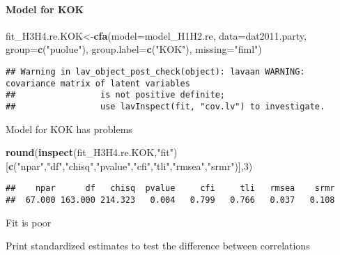 \documentclass[
]{article}
\newenvironment{Shaded}{\begin{snugshade}}{\end{snugshade}}
\newcommand{\DataTypeTok}[1]{\textcolor[rgb]{0.13,0.29,0.53}{#1}}
\newcommand{\DecValTok}[1]{\textcolor[rgb]{0.00,0.00,0.81}{#1}}
\newcommand{\KeywordTok}[1]{\textcolor[rgb]{0.13,0.29,0.53}{\textbf{#1}}}
\newcommand{\NormalTok}[1]{#1}
\newcommand{\StringTok}[1]{\textcolor[rgb]{0.31,0.60,0.02}{#1}}
\begin{document}
\newpage

\hypertarget{model-for-kok}{%
\paragraph{Model for KOK}\label{model-for-kok}}

\begin{Shaded}
\begin{Highlighting}[]
\NormalTok{fit_H3H4.re.KOK<-}\KeywordTok{cfa}\NormalTok{(}\DataTypeTok{model=}\NormalTok{model_H1H2.re,}
                    \DataTypeTok{data=}\NormalTok{dat2011.party,}
                    \DataTypeTok{group=}\KeywordTok{c}\NormalTok{(}\StringTok{"puolue"}\NormalTok{),}
                    \DataTypeTok{group.label=}\KeywordTok{c}\NormalTok{(}\StringTok{"KOK"}\NormalTok{),}
                    \DataTypeTok{missing=}\StringTok{"fiml"}\NormalTok{)}
\end{Highlighting}
\end{Shaded}

\begin{verbatim}
## Warning in lav_object_post_check(object): lavaan WARNING: covariance matrix of latent variables
##                 is not positive definite;
##                 use lavInspect(fit, "cov.lv") to investigate.
\end{verbatim}

Model for KOK has problems

\begin{Shaded}
\begin{Highlighting}[]
\KeywordTok{round}\NormalTok{(}\KeywordTok{inspect}\NormalTok{(fit_H3H4.re.KOK,}\StringTok{"fit"}\NormalTok{)}
\NormalTok{      [}\KeywordTok{c}\NormalTok{(}\StringTok{"npar"}\NormalTok{,}\StringTok{"df"}\NormalTok{,}\StringTok{"chisq"}\NormalTok{,}\StringTok{"pvalue"}\NormalTok{,}\StringTok{"cfi"}\NormalTok{,}\StringTok{"tli"}\NormalTok{,}\StringTok{"rmsea"}\NormalTok{,}\StringTok{"srmr"}\NormalTok{)],}\DecValTok{3}\NormalTok{)}
\end{Highlighting}
\end{Shaded}

\begin{verbatim}
##    npar      df   chisq  pvalue     cfi     tli   rmsea    srmr 
##  67.000 163.000 214.323   0.004   0.799   0.766   0.037   0.108
\end{verbatim}

Fit is poor

Print standardized estimates to test the difference between correlations
\end{document}
